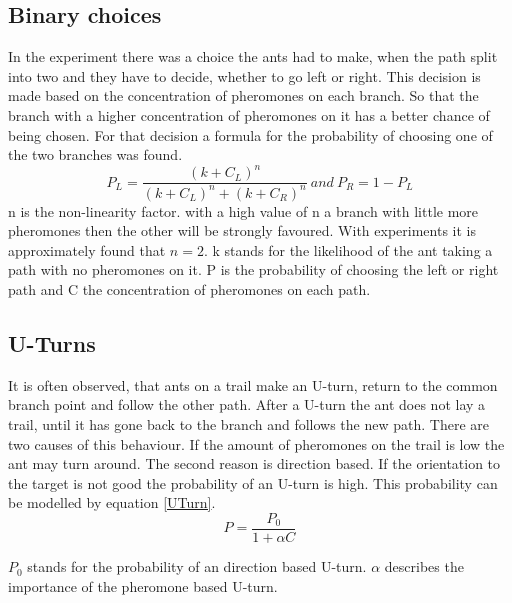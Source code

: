  \subsection{Binary choices}
 In the experiment there was a choice the ants had to make, when the path split into two and they have to decide, whether to go left or right. This decision is made based on the concentration of pheromones on each branch. So that the branch with a higher concentration of pheromones on it has a better chance of being chosen. For that decision a formula for the probability of choosing one of the two branches was found.
  \begin{equation} \label{binaryChoice}
 P_L = \frac{(k+C_L)^n}{(k+C_L)^n+(k+C_R)^n} \ and \  P_R = 1-P_L
 \end{equation}
 n is the non-linearity factor. with a high value of n a branch with little more pheromones then the other will be strongly favoured. With experiments it is approximately found that $n=2$. k stands for the likelihood of the ant taking a path with no pheromones on it. P is the probability of choosing the left or right path and C the concentration of pheromones on each path. 
 \subsection{U-Turns}
 It is often observed, that ants on a trail make an U-turn, return to the common branch point and follow the other path. After a U-turn the ant does not lay a trail, until it has gone back to the branch and follows the new path. There are two causes of this behaviour. If the amount of pheromones on the trail is low the ant may turn around. The second reason is direction based. If the orientation to the target is not good the probability of an U-turn is high. This probability can be modelled by equation \ref{UTurn}. \citep{camazine2003}
\begin{equation} \label{UTurn}
 P=\frac{P_0}{1+\alpha C}
\end{equation}

$P_0$ stands for the probability of an direction based U-turn. $\alpha$ describes the importance of the pheromone based U-turn.

